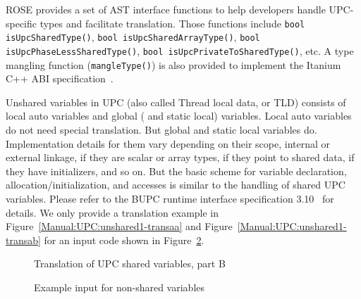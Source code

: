 ROSE provides a set of AST interface functions to help developers handle
UPC-specific types and facilitate translation. Those functions include 
\lstinline{bool isUpcSharedType()}, 
\lstinline{bool isUpcSharedArrayType()}, 
\lstinline{bool isUpcPhaseLessSharedType()}, 
\lstinline{bool isUpcPrivateToSharedType()}, etc. 
A type mangling function (\lstinline{mangleType()}) is also provided
to implement the Itanium C++ ABI specification~\cite{ItaniumCppABI}. 

Unshared variables in UPC (also called Thread local data, or TLD) consists
of local auto variables and global ( and static local) variables.
Local auto variables do not need special translation. 
But global and static local variables do. 
Implementation details for them vary depending on their scope, internal or
external linkage, if they are scalar or array types, if they point to
shared data, if they have initializers, and so on.
But the basic scheme for variable declaration, allocation/initialization, and
accesses is similar to the handling of shared UPC variables.
Please refer to the BUPC runtime interface specification
3.10~\cite{BUPC3.10} for details.
We only provide a translation example in
Figure~\ref{Manual:UPC:unshared1-transaa} and
Figure~\ref{Manual:UPC:unshared1-transab} for an input code shown in
Figure~\ref{Manual:UPC:unshared1}.



\begin{figure}[!h]
{\indent
  {\mySmallFontSize
    \begin{latexonly}
    
    \end{latexonly}
    \begin{htmlonly}
    
    \end{htmlonly}
  }
}
\caption{Translation of UPC shared variables, part B}
\label{Manual:UPC:shared1-transab}
\end{figure}

\begin{figure}[!h]
{\indent
  {\mySmallFontSize
    \begin{latexonly}
    
    \end{latexonly}
    \begin{htmlonly}
    
    \end{htmlonly}
  }
}
\caption{Example input for non-shared variables}
\label{Manual:UPC:unshared1}
\end{figure}

